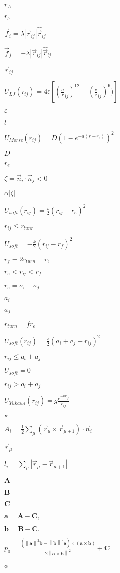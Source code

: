 \documentclass{article}
\begin{document}
$ r_A $
\pagebreak

$ r_b $
\pagebreak

$ \vec f_i = \lambda \left|\vec r_{ij}\right|\hat{\vec r}_{ij} $
\pagebreak

$ \vec f_j = -\lambda \left|\vec r_{ij}\right|\hat{\vec r}_{ij} $
\pagebreak

$ \vec r_{ij} $
\pagebreak

$ U_{LJ}\left(r_{ij}\right) = 4\varepsilon \left[\left(\frac \sigma r_{ij}\right)^{12}-\left(\frac \sigma r_{ij}\right)^6)\right] $
\pagebreak

$ \varepsilon $
\pagebreak

$ l $
\pagebreak

$ U_{Morse}\left(r_{ij}\right) = D \left(1 - e^{-a(r-r_e)} \right)^2 $
\pagebreak

$ D $
\pagebreak

$ r_e $
\pagebreak

$ \zeta = \vec n_i \cdot \vec n_j < 0 $
\pagebreak

$ \alpha |\zeta| $
\pagebreak

$ U_{soft}\left(r_{ij}\right) = \frac{k}{2} \left(r_{ij} - r_e \right)^2 $
\pagebreak

$ r_{ij} \le r_{tunr} $
\pagebreak

$ U_{soft} = -\frac{k}{2} \left(r_{ij} - r_f \right)^2 $
\pagebreak

$ r_f = 2 r_{turn} - r_e $
\pagebreak

$ r_e < r_{ij} < r_f $
\pagebreak

$ r_e = a_i + a_j $
\pagebreak

$ a_i $
\pagebreak

$ a_j $
\pagebreak

$ r_{turn} = fr_e $
\pagebreak

$ U_{soft}\left(r_{ij}\right) = \frac{k}{2} \left(a_i + a_j - r_{ij}\right)^2 $
\pagebreak

$ r_{ij} \le a_i + a_j $
\pagebreak

$ U_{soft} = 0 $
\pagebreak

$ r_{ij} > a_i + a_j $
\pagebreak

$ U_{Yukawa}\left(r_{ij}\right) = g\frac{e^{-\kappa r_{ij}}}{r_{ij}} $
\pagebreak

$ \kappa $
\pagebreak

$ A_i = \frac{1}{2}\sum_{\mu}\left(\vec r_\mu\times\vec r_{\mu+1}\right)\cdot\vec n_i $
\pagebreak

$ \vec r_\mu $
\pagebreak

$ l_i = \sum_{\mu}\left|\vec r_\mu-\vec r_{\mu+1}\right| $
\pagebreak

$ \mathbf{A} $
\pagebreak

$ \mathbf{B} $
\pagebreak

$ \mathbf{C} $
\pagebreak

$ \mathbf{a} = \mathbf{A}-\mathbf{C}, $
\pagebreak

$ \mathbf{b} = \mathbf{B}-\mathbf{C}. $
\pagebreak

$ p_0 = \frac{(\left\|\mathbf{a}\right\|^2\mathbf{b}-\left\|\mathbf{b}\right\|^2\mathbf{a}) \times (\mathbf{a} \times \mathbf{b})} {2 \left\|\mathbf{a}\times\mathbf{b}\right\|^2} + \mathbf{C} $
\pagebreak

$ \phi $
\pagebreak
\end{document}
